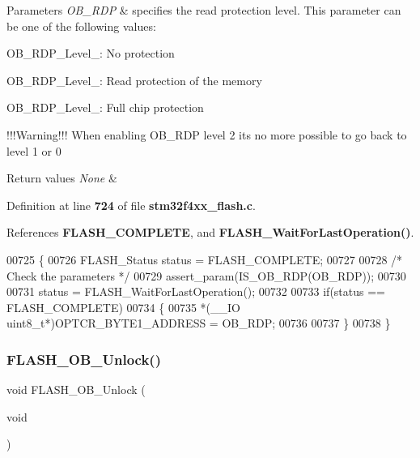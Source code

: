 \begin{DoxyParams}{Parameters}
{\em O\+B\+\_\+\+R\+DP} & specifies the read protection level. This parameter can be one of the following values\+: \begin{DoxyItemize}
\item O\+B\+\_\+\+R\+D\+P\+\_\+\+Level\+\_\+: No protection \item O\+B\+\_\+\+R\+D\+P\+\_\+\+Level\+\_\+: Read protection of the memory \item O\+B\+\_\+\+R\+D\+P\+\_\+\+Level\+\_\+: Full chip protection\end{DoxyItemize}
!!!\+Warning!!! When enabling O\+B\+\_\+\+R\+DP level 2 it\textquotesingle{}s no more possible to go back to level 1 or 0\\
\hline
\end{DoxyParams}

\begin{DoxyRetVals}{Return values}
{\em None} & \\
\hline
\end{DoxyRetVals}


Definition at line \textbf{ 724} of file \textbf{ stm32f4xx\+\_\+flash.\+c}.



References \textbf{ F\+L\+A\+S\+H\+\_\+\+C\+O\+M\+P\+L\+E\+TE}, and \textbf{ F\+L\+A\+S\+H\+\_\+\+Wait\+For\+Last\+Operation()}.


\begin{DoxyCode}
00725 \{
00726   FLASH_Status status = FLASH_COMPLETE;
00727 
00728   \textcolor{comment}{/* Check the parameters */}
00729   assert_param(IS_OB_RDP(OB\_RDP));
00730 
00731   status = FLASH_WaitForLastOperation();
00732 
00733   \textcolor{keywordflow}{if}(status == FLASH_COMPLETE)
00734   \{
00735     *(\_\_IO uint8\_t*)OPTCR_BYTE1_ADDRESS = OB\_RDP;
00736 
00737   \}
00738 \}
\end{DoxyCode}
\mbox{\label{group__FLASH_ga518d6e3bbba2adf1523e8454f62348e9}} 
\subsubsection{F\+L\+A\+S\+H\+\_\+\+O\+B\+\_\+\+Unlock()}
{\footnotesize\ttfamily void F\+L\+A\+S\+H\+\_\+\+O\+B\+\_\+\+Unlock (\begin{DoxyParamCaption}\item[{void}]{ }\end{DoxyParamCaption})}



